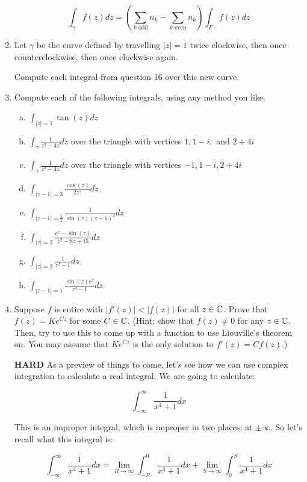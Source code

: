 \begin{enumerate}
$$\int_{\gamma} f(z)dz = \left(\sum_{k \text{ odd}} n_k - \sum_{k \text{ even}}n_k\right)\int_{\Gamma} f(z)dz$$

\item Let $\gamma$ be the curve defined by travelling $|z| = 1$ twice clockwise, then once counterclockwise, then once clockwise again.

Compute each integral from question 16 over this new curve.

\item Compute each of the following integrals, using any method you like.
\begin{enumerate}[a)]
\item $\int_{|z| = 1} \tan(z)dz$ 
\item $\int_{\gamma} \frac{1}{z^2 - 4z}dz$ over the triangle with vertices $1, 1 - i,$ and $2 + 4i$
\item $\int_{\gamma} \frac{1}{z^2 - 4z}dz$ over the triangle with vertices $-1,1-i,2 + 4i$
\item $\int_{|z-1| = 3} \frac{\cos(z)}{2z^5} dz$
\item $\int_{|z-1| = \frac{1}{2}} \frac{1}{\sin(z)(z-1)^2}dz$
\item $\int_{|z| = 2}\frac{e^z - \sin(z)}{z^2 - 8z + 15}dz$
\item $\int_{|z| = 2} \frac{1}{z^2 -  1}dz$
\item $\int_{|z - 1| = 1} \frac{\sin(z)e^z}{z^4 - 1}dz$
\end{enumerate}

\item  Suppose $f$ is entire with $|f'(z)| < |f(z)|$ for all $z\in \mathbb{C}$. Prove that $f(z) = Ke^{Cz}$ for some $C\in \mathbb{C}$. (Hint: show that $f(z) \ne 0$ for any $z \in \mathbb{C}$. Then, try to use this to come up with a function to use Liouville's theorem on. You may assume that $Ke^{Cz}$ is the only solution to $f'(z) = Cf(z)$.)


\item[\textbf{HARD}] As a preview of things to come, let's see how we can use complex integration to calculate a real integral. We are going to calculate:

$$\int_{-\infty}^\infty \frac{1}{x^4 +1}dx$$

This is an improper integral, which is improper in two places: at $\pm \infty$. So let's recall what this integral is:

$$\int_{-\infty}^\infty \frac{1}{x^4 + 1} dx = \lim_{R \rightarrow \infty} \int_{-R}^0 \frac{1}{x^4 + 1}dx + \lim_{S\rightarrow \infty} \int_0^S \frac{1}{x^4 + 1}dx$$


\end{enumerate}

